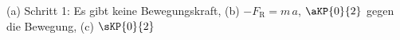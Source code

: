 (a) Schritt 1: Es gibt keine Bewegungskraft, (b) $-F_\mathrm{R} = m\,a$, $\aKP{0}{2}$ gegen die Bewegung, (c) $\sKP{0}{2}$
